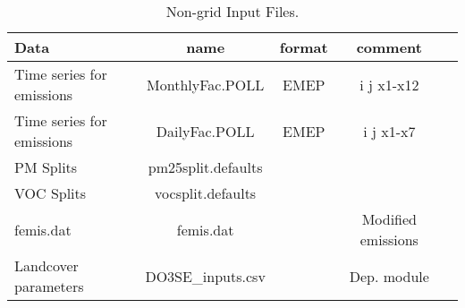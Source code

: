 
\begin{table}[h]
\caption{Non-grid Input Files.}
\label{Tab:Inputs}
\begin{tabular}{lcccc}\hline
Data & name   &format& comment\\ \hline
Time series for emissions&MonthlyFac.POLL&EMEP&i j x1-x12&\\
Time series for emissions&DailyFac.POLL&EMEP&i j x1-x7&\\
PM Splits                   &pm25split.defaults&& \\
VOC Splits&vocsplit.defaults&& \\
femis.dat           & femis.dat    & & Modified emissions \\
Landcover parameters& DO3SE\_inputs.csv && Dep. module \\
\hline
\end{tabular}
\end{table}
